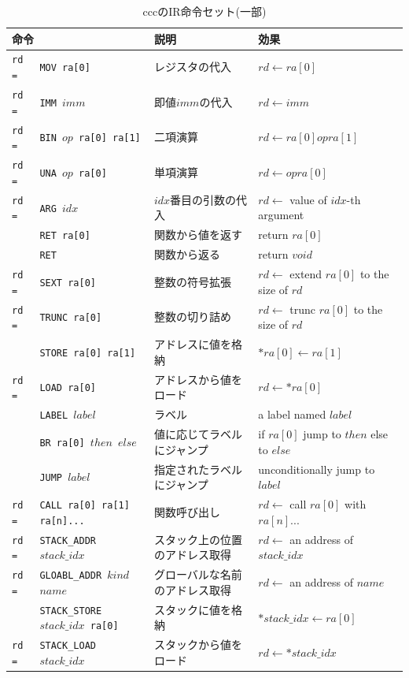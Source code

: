 \documentclass[uplatex,a4paper]{jsarticle}
\begin{document}
\begin{table}[hp]
  \centering
  \begin{tabular}{llll}
    \multicolumn{2}{l}{命令} & 説明 & 効果 \\ \hline\hline
    \texttt{rd =}&\texttt{MOV ra[0]} & レジスタの代入 & $rd \gets ra[0]$ \\
    \texttt{rd =}&\texttt{IMM $imm$} & 即値$imm$の代入 & $rd \gets imm$ \\
    \texttt{rd =}&\texttt{BIN $op$ ra[0] ra[1]} & 二項演算 & $rd \gets ra[0] \mathbin{op} ra[1]$ \\
    \texttt{rd =}&\texttt{UNA $op$ ra[0]} & 単項演算 & $rd \gets \mathrel{op} ra[0]$ \\
    \texttt{rd =}&\texttt{ARG $idx$} & $idx$番目の引数の代入 & $rd \gets $ value of $idx$-th argument \\
    &\texttt{RET ra[0]} & 関数から値を返す & return $ra[0]$ \\
    &\texttt{RET} & 関数から返る & return $void$ \\
    \texttt{rd =}&\texttt{SEXT ra[0]} & 整数の符号拡張 & $rd \gets$ extend $ra[0]$ to the size of $rd$ \\
    \texttt{rd =}&\texttt{TRUNC ra[0]} & 整数の切り詰め & $rd \gets$ trunc $ra[0]$ to the size of $rd$ \\
    &\texttt{STORE ra[0] ra[1]} & アドレスに値を格納 & $*ra[0] \gets ra[1]$ \\
    \texttt{rd =}&\texttt{LOAD ra[0]} & アドレスから値をロード & $rd \gets *ra[0]$ \\
    &\texttt{LABEL $label$} & ラベル & a label named $label$ \\
    &\texttt{BR ra[0] $then$ $else$} & 値に応じてラベルにジャンプ & if $ra[0]$ jump to $then$ else to $else$ \\
    &\texttt{JUMP $label$} & 指定されたラベルにジャンプ & unconditionally jump to $label$ \\
    \texttt{rd =}&\texttt{CALL ra[0] ra[1] ra[n]...} & 関数呼び出し & $rd \gets$ call $ra[0]$ with $ra[n]...$ \\
    \texttt{rd =}&\texttt{STACK\_ADDR $stack\_idx$} & スタック上の位置のアドレス取得 & $rd \gets $ an address of $stack\_idx$ \\
    \texttt{rd =}&\texttt{GLOABL\_ADDR $kind$ $name$} & グローバルな名前のアドレス取得 & $rd \gets $ an address of $name$ \\
    &\texttt{STACK\_STORE $stack\_idx$ ra[0]} & スタックに値を格納 & $*stack\_idx \gets ra[0]$ \\
    \texttt{rd =}&\texttt{STACK\_LOAD $stack\_idx$} & スタックから値をロード & $rd \gets *stack\_idx$
  \end{tabular}
  \caption{cccのIR命令セット(一部)}
  \label{tb:ccc_isa}
\end{table}
\end{document}
